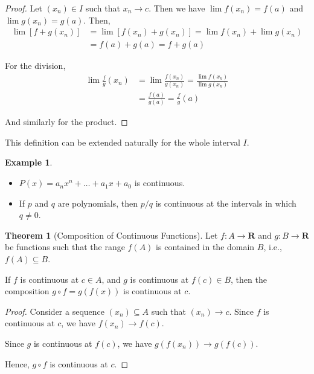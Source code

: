 \documentclass[tikz,12pt,a4paper]{article}
\theoremstyle{definition}
\newtheorem{theorem}{Theorem}[section]
\newtheorem{example}{Example}[section]
\begin{document}
\begin{proof}
	Let $(x_n) \in I$ such that $x_n \longrightarrow c$. Then we have $\lim f(x_n) = f(a)$ and $\lim g(x_n) = g(a)$. Then,
	\begin{equation*}
		\begin{aligned}
			\lim [f+g(x_n)] &= \lim [f(x_n) + g(x_n)] = \lim f(x_n) + \lim g(x_n) \\
			& = f(a) + g(a) = f+g(a)
		\end{aligned}
	\end{equation*}
	
	For the division,
	\begin{equation*}
		\begin{aligned}
			\lim \frac{f}{g} (x_n) &= \lim \frac{f(x_n)}{g(x_n)} = \frac{\lim f(x_n)}{\lim g(x_n)} \\
			&= \frac{f(a)}{g(a)} = \frac{f}{g} (a)
		\end{aligned}
	\end{equation*}
	
	And similarly for the product.
\end{proof}

This definition can be extended naturally for the whole interval $I$.

\begin{example}
\begin{itemize} \hfill
	\item $P(x) = a_n x^n + \ldots + a_1 x + a_0$ is continuous.
	\item If $p$ and $q$ are polynomials, then $p/q$ is continuous at the intervals in which $q \neq 0$.
\end{itemize}
\end{example}

\begin{theorem}[Composition of Continuous Functions]
	Let $f : A \longrightarrow \textbf{R}$ and $g : B \longrightarrow \textbf{R}$ be functions such that the range $f(A)$ is contained in the domain $B$, i.e., $f(A) \subseteq B$.
	
	If $f$ is continuous at $c \in A$, and $g$ is continuous at $f(c) \in B$, then the composition $g \circ f = g(f(x))$ is continuous at $c$.
\end{theorem}

\begin{proof}
	Consider a sequence $(x_n) \subseteq A$ such that $(x_n) \longrightarrow c$. Since $f$ is continuous at $c$, we have $f(x_n) \longrightarrow f(c)$. 
	
	Since $g$ is continuous at $f(c)$, we have $g(f(x_n)) \longrightarrow g(f(c))$.
	
	Hence, $g \circ f$ is continuous at $c$.
\end{proof}
\end{document}
